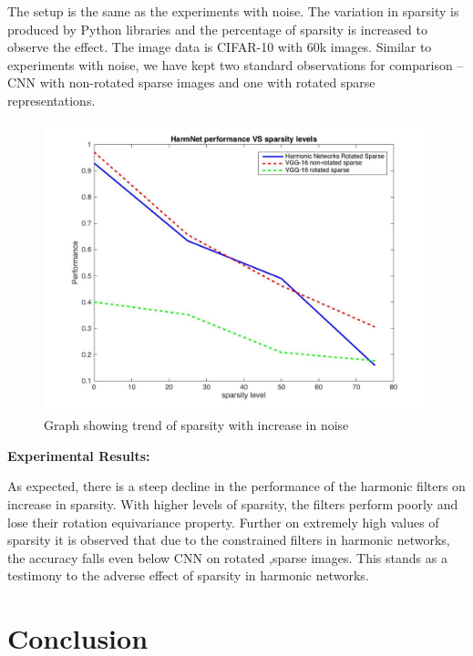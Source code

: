\documentclass{article}
\begin{document}
The setup is the same as the experiments with noise. The variation in sparsity is produced by Python libraries and the percentage of sparsity is increased to observe the effect. 
The image data is CIFAR-10 with 60k images.
Similar to experiments with noise, we have kept two standard observations for comparison – CNN with non-rotated sparse images and one with rotated sparse representations.

\begin{figure}[t!]
  \includegraphics[width=\linewidth]{vggAndHarmVsSparse.jpg}
  \caption{Graph showing trend of sparsity with increase in noise}
  \label{fig:SparseGraph}
\end{figure}

\textbf{Experimental Results:}

As expected, there is a steep decline in the performance of the harmonic filters on increase in sparsity. With higher levels of sparsity, the filters perform poorly and lose their rotation equivariance property. Further on extremely high values of sparsity it is observed that due to the constrained filters in harmonic networks, the accuracy falls even below CNN on rotated ,sparse images. This stands as a testimony to the adverse effect of sparsity in harmonic networks.


\section{Conclusion}
\end{document}
